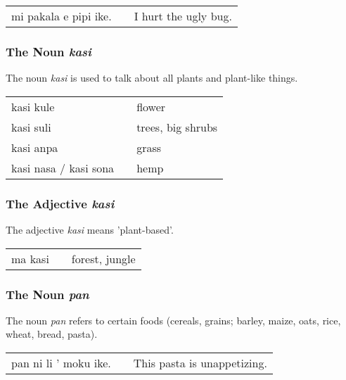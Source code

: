 \begin{supertabular}{p{5,5cm}|ll}
mi pakala e pipi ike. && I hurt the ugly bug.  \\
\end{supertabular} 

%
%
\subsubsection*{The Noun \textit{kasi}}
%
%
The noun \textit{kasi} is used to talk about all plants and plant-like things. 

\begin{supertabular}{p{5,5cm}|ll}
kasi kule && flower \\
kasi suli && trees, big shrubs \\
kasi anpa && grass \\
kasi nasa / kasi sona && hemp  \\
\end{supertabular} 

%
%
\subsubsection*{The Adjective \textit{kasi}}
%
%
The adjective \textit{kasi} means 'plant-based'.

\begin{supertabular}{p{5,5cm}|ll}
ma kasi && forest, jungle \\
\end{supertabular} 

%
%
\subsubsection*{The Noun \textit{pan}}
%

The noun \textit{pan} refers to certain foods (cereals, grains; barley, maize, oats, rice, wheat, bread, pasta). 

\begin{supertabular}{p{5,5cm}|ll}
pan ni li ' moku ike. && This pasta is unappetizing. \\
\end{supertabular} 

